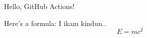 \documentclass{article}
\begin{document}
Hello, GitHub Actions!

Here's a formula:
I ikam kindun..
\[
E = mc^2
\]
\end{document}
